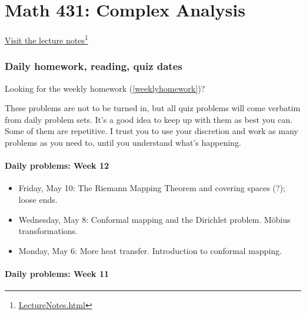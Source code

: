 \def\encoding{UTF-8}

\def\mytitle{Math 431 Homework and Quiz Schedule}
\def\myauthor{Dave Rosoff}
\def\mydate{February 6, 2013}
\def\htmlheaderlevel{1}
\def\latexmode{article}

\chapter{Math 431: Complex Analysis}
\label{math431:complexanalysis}

\href{LectureNotes.html}{Visit the lecture notes}\footnote{\href{LectureNotes.html}{LectureNotes.html}}

\subsection{Daily homework, reading, quiz dates}
\label{dailyhomework}

Looking for the weekly homework (\autoref{weeklyhomework})?

These problems are not to be turned in, but all quiz problems will come verbatim from daily problem sets. It's a good idea to keep up with them as best you can. Some of them are repetitive. I trust you to use your discretion and work as many problems as you need to, until you understand what's happening.

\subsubsection{Daily problems: Week 12}
\label{dailyproblems:week12}

\begin{itemize}
\item Friday, May 10: The Riemann Mapping Theorem and covering spaces (?); loose ends.

\item Wednesday, May 8: Conformal mapping and the Dirichlet problem. M\"obius transformations.

\item Monday, May 6: More heat transfer. Introduction to conformal mapping.

\end{itemize}

\subsubsection{Daily problems: Week 11}
\label{dailyproblems:week11}

